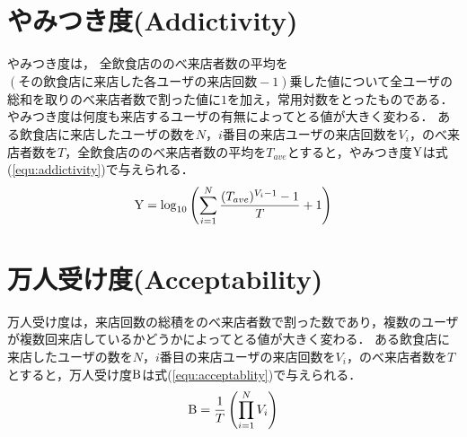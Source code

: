 \section{やみつき度(Addictivity)}

やみつき度は，%
全飲食店ののべ来店者数の平均を$(その飲食店に来店した各ユーザの来店回数-1)$乗した値について全ユーザの総和を取りのべ来店者数で割った値に$1$を加え，常用対数をとったものである．
やみつき度は何度も来店するユーザの有無によってとる値が大きく変わる．
ある飲食店に来店したユーザの数を$N$，$i$番目の来店ユーザの来店回数を$V_i$，のべ来店者数を$T$，全飲食店ののべ来店者数の平均を$T_{ave}$とすると，やみつき度$\rm Y$は式(\ref{equ:addictivity})で与えられる．
\begin{equation}
	\label{equ:addictivity}
	{\rm Y} = \log_{10}{\left(\sum^{N}_{i=1} \frac{(T_{ave})^{V_i-1}-1}{T}+1\right)}
\end{equation}

\section{万人受け度(Acceptability)}

万人受け度は，来店回数の総積をのべ来店者数で割った数であり，複数のユーザが複数回来店しているかどうかによってとる値が大きく変わる．
ある飲食店に来店したユーザの数を$N$，$i$番目の来店ユーザの来店回数を$V_i$，のべ来店者数を$T$とすると，万人受け度$\rm B$は式(\ref{equ:acceptablity})で与えられる．
\begin{equation}
	\label{equ:acceptability}
	{\rm B} = \frac{1}{T} \left(\prod^N_{i=1}V_i\right)
\end{equation}

